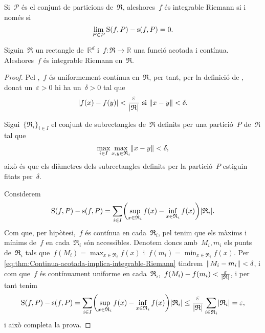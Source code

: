 \documentclass[../calcul-en-diverses-variables.tex]{subfiles}
\begin{document}
    \begin{corollary}\label{corollary:Sumes-superior-i-inferior-iguals-integrable-Riemann}
        Si~\(\mathcal{P}\) és el conjunt de particions de~\(\mathfrak{R}\), aleshores~\(f\) és integrable Riemann si i només si
        \[
            \lim_{P\in\mathcal{P}}\operatorname{S}(f,P)-\operatorname{s}(f,P)=0.
        \]%
    \end{corollary}
    \begin{theorem}
        \label{thm:Continua-acotada-implica-integrable-Riemann}
        Siguin~\(\mathfrak{R}\) un rectangle de~\(\mathbb{R}^{d}\) i~\(f\colon\mathfrak{R}\to\mathbb{R}\) una funció acotada i contínua.
        Aleshores~\(f\) és integrable Riemann en~\(\mathfrak{R}\).
    \end{theorem}
    \begin{proof}
        Pel ,~\(f\) és uniformement contínua en~\(\mathfrak{R}\), per tant, per la definició de , donat un~\(\varepsilon>0\) hi ha un~\(\delta>0\) tal que
        \[
            \abs{f(x)-f(y)}<\frac{\varepsilon}{\abs{\mathfrak{R}}}\text{ si }\norm{x-y}<\delta.
        \]

        Sigui~\(\{\mathfrak{R}_{i}\}_{i\in I}\) el conjunt de subrectangles de~\(\mathfrak{R}\) definits per una partició~\(P\) de~\(\mathfrak{R}\) tal que
        \[
            \max_{i\in I}\max_{x,y\in \mathfrak{R}_{i}}\norm{x-y}<\delta,
        \]
        això és que els diàmetres dels subrectangles definits per la partició~\(P\) estiguin fitats per~\(\delta\).

        Considerem
        \begin{equation}\label{eq:thm:Continua-acotada-implica-integrable-Riemann}
        \Ssup(f,P)-\sinf(f,P)=\sum_{i\in I}\left(\sup_{x\in \mathfrak{R}_{i}}f(x)-\inf_{x\in \mathfrak{R}_{i}}f(x)\right)\abs{\mathfrak{R}_{i}}.
        \end{equation}
        Com que, per hipòtesi,~\(f\) és contínua en cada~\(\mathfrak{R}_{i}\), pel  tenim que els màxims i mínims de~\(f\) en cada~\(\mathfrak{R}_{i}\) són accessibles.
        Denotem doncs amb~\(M_{i},m_{i}\) els punts de~\(\mathfrak{R}_{i}\) tals que~\(f(M_{i})=\max_{x\in \mathfrak{R}_{i}}f(x)\) i~\(f(m_{i})=\min_{x\in \mathfrak{R}_{i}}f(x)\).
        Per \eqref{eq:thm:Continua-acotada-implica-integrable-Riemann} tindrem~\(\norm{M_{i}-m_{i}}<\delta\), i com que~\(f\) és contínuament uniforme en cada~\(\mathfrak{R}_{i}\),~\(f(M_{i})-f(m_{i})<\frac{\varepsilon}{\abs{\mathfrak{R}}}\), i per tant tenim
        \[
            \Ssup(f,P)-\sinf(f,P)=\sum_{i\in I}\left(\sup_{x\in \mathfrak{R}_{i}}f(x)-\inf_{x\in \mathfrak{R}_{i}}f(x)\right)\abs{\mathfrak{R}_{i}}\leq\frac{\varepsilon}{\abs{\mathfrak{R}}}\sum_{i\in \mathfrak{R}_{i}}\abs{\mathfrak{R}_{i}}=\varepsilon,
        \]
        i això completa la prova.
    \end{proof}
\end{document}
